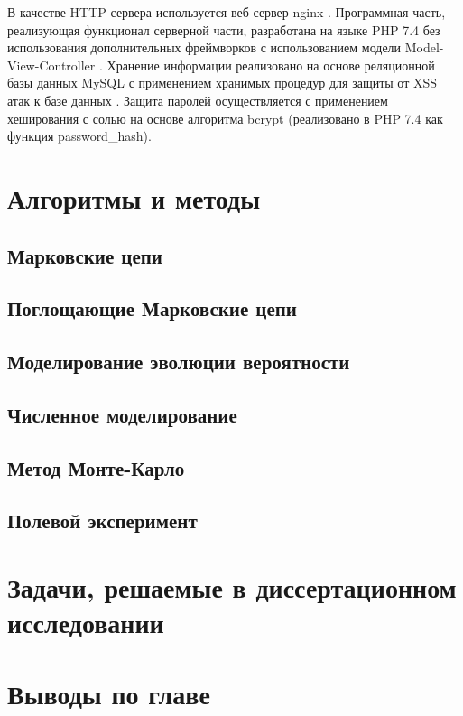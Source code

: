 В качестве HTTP-сервера используется веб-сервер nginx \cite{}. Программная часть, реализующая функционал серверной части, 
разработана на языке PHP 7.4 \cite{} без использования дополнительных фреймворков с использованием модели Model-View-Controller \cite{}. 
Хранение информации реализовано на основе реляционной базы данных MySQL с применением хранимых процедур для защиты от XSS атак к базе данных \cite{}.
Защита паролей осуществляется с применением хеширования с солью на основе алгоритма bcrypt (реализовано в PHP 7.4 как функция password_hash).

\section{Алгоритмы и методы}\label{sec:ch1/sec3}

\subsection{Марковские цепи}\label{subsec:ch1/sec3/sub1}

\subsection{Поглощающие Марковские цепи}\label{subsec:ch1/sec3/sub2}
\subsection{Моделирование эволюции вероятности}\label{subsec:ch1/sec3/sub3}
\subsection{Численное моделирование}\label{subsec:ch1/sec3/sub4}
\subsection{Метод Монте-Карло}\label{subsec:ch1/sec3/sub5}
\subsection{Полевой эксперимент}\label{subsec:ch1/sec3/sub6}

\section{Задачи, решаемые в диссертационном исследовании}\label{sec:ch1/sec4}

\section{Выводы по главе}\label{sec:ch1/sec5}

















